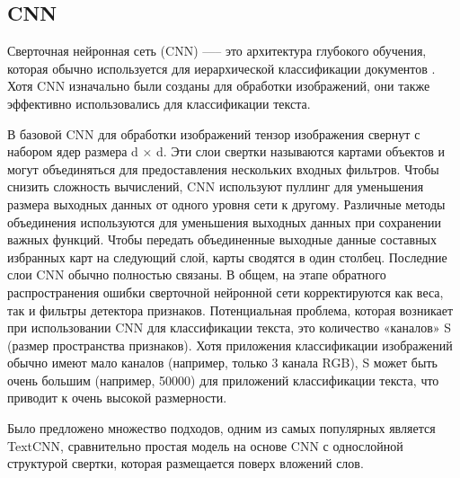 \subsection{CNN}
Сверточная нейронная сеть (CNN) —-- это архитектура глубокого обучения, которая обычно используется для иерархической классификации документов \cite{6, 168}. Хотя CNN изначально были созданы для обработки изображений, они также эффективно использовались для классификации текста\cite{27, 187}.

В базовой CNN для обработки изображений тензор изображения свернут с набором ядер размера d × d. Эти слои свертки называются картами объектов и могут объединяться для предоставления нескольких входных фильтров. Чтобы снизить сложность вычислений, CNN используют пуллинг для уменьшения размера выходных данных от одного уровня сети к другому. Различные методы объединения используются для уменьшения выходных данных при сохранении важных функций\cite{188}. Чтобы передать объединенные выходные данные составных избранных карт на следующий слой, карты сводятся в один столбец. Последние слои CNN обычно полностью связаны. В общем, на этапе обратного распространения ошибки сверточной нейронной сети корректируются как веса, так и фильтры детектора признаков. Потенциальная проблема, которая возникает при использовании CNN для классификации текста, это количество «каналов» S (размер пространства признаков). Хотя приложения классификации изображений обычно имеют мало каналов (например, только 3 канала RGB), S может быть очень большим (например, 50000) для приложений классификации текста, что приводит к очень высокой размерности. 

Было предложено множество подходов, одним из самых популярных является TextCNN\cite{69}, сравнительно простая модель на основе CNN с однослойной структурой свертки, которая размещается поверх вложений слов.

